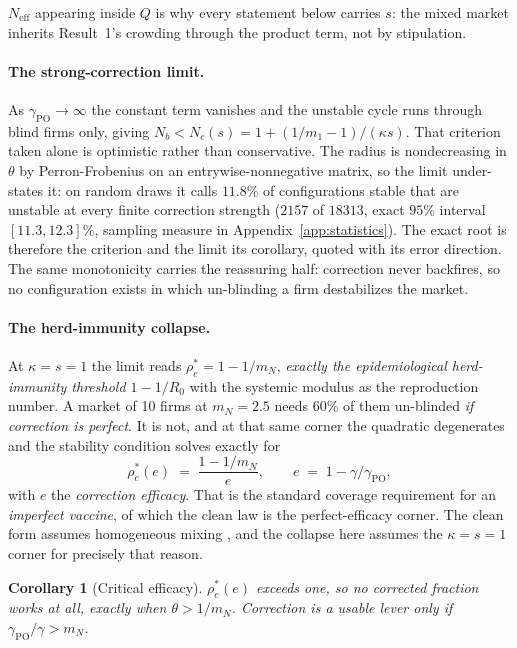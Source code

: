 \documentclass{article}
\theoremstyle{plain}
\newtheorem{corollary}[theorem]{Corollary}
\theoremstyle{definition}
\newcommand{\Neff}{N_{\mathrm{eff}}}
\newcommand{\mN}{m_N}
\begin{document}
$\Neff$ appearing inside $Q$ is why every statement below carries $s$: the mixed market inherits Result~1's crowding through the product term, not by stipulation.

\paragraph{The strong-correction limit.}
As $\gamma_{\mathrm{PO}}\to\infty$ the constant term vanishes and the unstable cycle runs through blind firms only, giving $N_b < N_c(s) = 1 + (1/m_1 - 1)/(\kappa s)$. That criterion taken alone is optimistic rather than conservative. The radius is nondecreasing in $\theta$ by Perron-Frobenius on an entrywise-nonnegative matrix, so the limit under-states it: on random draws it calls $11.8\%$ of configurations stable that are unstable at every finite correction strength ($2157$ of $18313$, exact $95\%$ interval $[11.3,12.3]\%$, sampling measure in Appendix~\ref{app:statistics}). The exact root is therefore the criterion and the limit its corollary, quoted with its error direction. The same monotonicity carries the reassuring half: correction never backfires, so no configuration exists in which un-blinding a firm destabilizes the market.

\paragraph{The herd-immunity collapse.}
At $\kappa = s = 1$ the limit reads $\rho_c^{*} = 1 - 1/\mN$, \emph{exactly the epidemiological herd-immunity threshold $1-1/R_0$} with the systemic modulus as the reproduction number. A market of 10 firms at $\mN = 2.5$ needs 60\% of them un-blinded \emph{if correction is perfect}. It is not, and at that same corner the quadratic degenerates and the stability condition solves exactly for
\begin{equation}
\rho_c^{*}(e) \;=\; \frac{1 - 1/\mN}{e}, \qquad e \;=\; 1 - \gamma/\gamma_{\mathrm{PO}},
\end{equation}
with $e$ the \emph{correction efficacy}. That is the standard coverage requirement for an \emph{imperfect vaccine}, of which the clean law is the perfect-efficacy corner. The clean form assumes homogeneous mixing \citep{fine2011}, and the collapse here assumes the $\kappa=s=1$ corner for precisely that reason.

\begin{corollary}[Critical efficacy]
\label{cor:efficacy}
$\rho_c^{*}(e)$ exceeds one, so no corrected fraction works at all, exactly when $\theta > 1/\mN$. Correction is a usable lever only if $\gamma_{\mathrm{PO}}/\gamma > \mN$.
\end{corollary}
\end{document}
